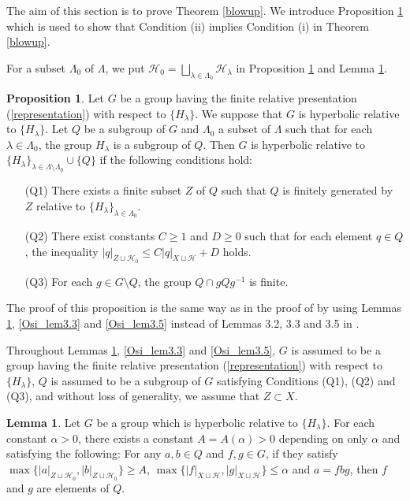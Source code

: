 \documentclass{amsart}
\theoremstyle{definition}
\newtheorem{Lem}[Thm]{Lemma}
\newtheorem{Prop}[Thm]{Proposition}
\begin{document}
The aim of this section is to prove Theorem \ref{blowup}. 
We introduce Proposition \ref{rel_Osi_thm1.5} which is used to show that Condition (ii) implies Condition (i) in Theorem \ref{blowup}. 

For a subset $\Lambda_0$ of $\Lambda$, we put ${\mathcal H}_0=\bigsqcup_{\lambda\in\Lambda_0}{\mathcal H}_\lambda$ in Proposition \ref{rel_Osi_thm1.5} and Lemma \ref{Osi_lem3.2}. 

\begin{Prop}\label{rel_Osi_thm1.5}
Let $G$ be a group having the finite relative presentation (\ref{representation}) with respect to $\{H_\lambda\}$. 
We suppose that $G$ is hyperbolic relative to $\{H_\lambda\}$. 
Let $Q$ be a subgroup of $G$ and $\Lambda_0$ a subset of $\Lambda$ such that for each $\lambda\in\Lambda_0$, the group $H_\lambda$ is a subgroup of $Q$. 
Then $G$ is hyperbolic relative to $\{H_\lambda\}_{\lambda \in \Lambda \setminus \Lambda_0}\cup \{Q\}$ if the following conditions hold:
\begin{enumerate}
\item[(Q1)] There exists a finite subset $Z$ of $Q$ such that $Q$ is finitely generated by $Z$ relative to $\{H_\lambda\}_{\lambda\in\Lambda_0}$.
\item[(Q2)] There exist constants $C\geq 1$ and $D \geq 0$ such that for each element $q \in Q$, the inequality $|q|_{Z\sqcup\mathcal H_0} \leq C |q|_{X\sqcup \mathcal{H}}+D$ holds.
\item[(Q3)] For each $g \in G\setminus Q$, the group $Q \cap gQg^{-1}$ is finite. 
\end{enumerate} 
\end{Prop}

The proof of this proposition is the same way as in the proof of \cite[Theorem 1.5]{Osi06a} by using Lemmas \ref{Osi_lem3.2}, \ref{Osi_lem3.3} and \ref{Osi_lem3.5} instead of Lemmas 3.2, 3.3 and 3.5 in \cite{Osi06a}. 

Throughout Lemmas \ref{Osi_lem3.2}, \ref{Osi_lem3.3} and \ref{Osi_lem3.5}, $G$ is assumed to be a group having the finite relative presentation (\ref{representation}) with respect to $\{H_\lambda\}$, $Q$ is assumed to be a subgroup of $G$ satisfying Conditions (Q1), (Q2) and (Q3), and without loss of generality, we assume that $Z \subset X$.  

\begin{Lem}\label{Osi_lem3.2}
Let $G$ be a group which is hyperbolic relative to $\{H_\lambda\}$. 
For each constant $\alpha >0$, there exists a constant $A=A(\alpha)>0$ depending on only $\alpha$ and satisfying the following: 
For any $a,b \in Q$ and $f,g \in G$, if they satisfy $\max\{|a|_{Z \sqcup \mathcal{H}_0}, |b|_{Z \sqcup \mathcal{H}_0}\}\geq A$, $\max\{|f|_{X\sqcup \mathcal{H}}, |g|_{X \sqcup \mathcal{H}}\}\leq \alpha$ and $a=fbg$, then $f$ and $g$ are elements of $Q$.  
\end{Lem}
\end{document}
